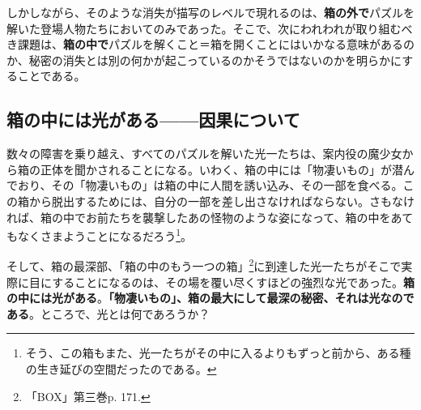 \documentclass[9pt,b5j,twoside,twocolumn]{utarticle}
\begin{document}
しかしながら、そのような消失が描写のレベルで現れるのは、\textbf{箱の外で}パズルを解いた登場人物たちにおいてのみであった。そこで、次にわれわれが取り組むべき課題は、\textbf{箱の中で}パズルを解くこと＝箱を開くことにはいかなる意味があるのか、秘密の消失とは別の何かが起こっているのかそうではないのかを明らかにすることである。

\subsection{\tbaselineshift =3.0pt 箱の中には光がある------因果について}

数々の障害を乗り越え、すべてのパズルを解いた光一たちは、案内役の魔少女から箱の正体を聞かされることになる。いわく、箱の中には「物凄いもの」が潜んでおり、その「物凄いもの」は箱の中に人間を誘い込み、その一部を食べる。この箱から脱出するためには、自分の一部を差し出さなければならない。さもなければ、箱の中でお前たちを襲撃したあの怪物のような姿になって、箱の中をあてもなくさまようことになるだろう\footnote{そう、この箱もまた、光一たちがその中に入るよりもずっと前から、ある種の生き延びの空間だったのである。}。

そして、箱の最深部、「箱の中のもう一つの箱」\footnote{「BOX」第三巻p. 171.}に到達した光一たちがそこで実際に目にすることになるのは、その場を覆い尽くすほどの強烈な光であった。\textbf{箱の中には光がある}。\textbf{「物凄いもの」、箱の最大にして最深の秘密、それは光なのである}。ところで、光とは何であろうか？
\end{document}
